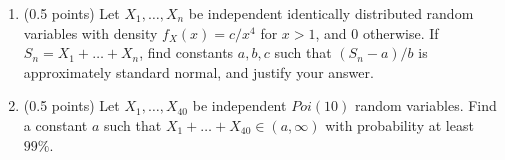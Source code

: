 \documentclass[a4paper]{report}
\begin{document}
\begin{problem}
\begin{enumerate}
\item (0.5 points) Let $X_1,\dots,X_n$ be independent identically distributed random variables with density $f_X(x)=c/x^4$ for $x>1$, and 0 otherwise. If $S_n=X_1+\dots+X_n$, find constants $a,b,c$ such that $(S_n-a)/b$ is approximately standard normal, and justify your answer.
\item (0.5 points) Let $X_1,\dots,X_{40}$ be independent $Poi(10)$ random variables. Find a constant $a$ such that $X_1+\dots+X_{40}\in(a,\infty)$ with probability at least $99\%$.
\end{enumerate}
\end{problem}
\end{document}
